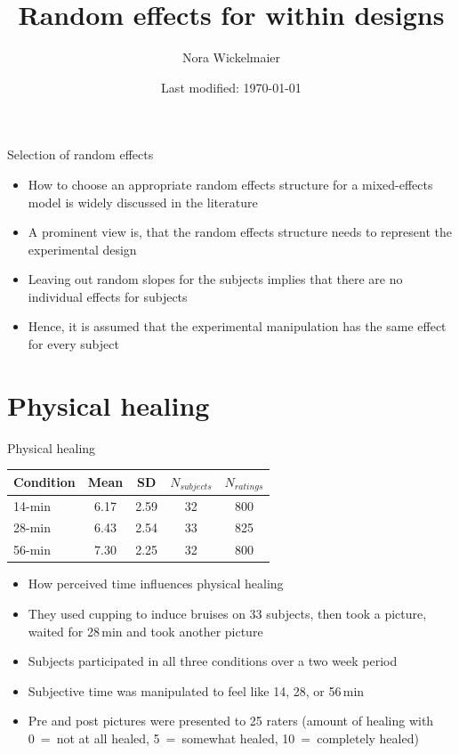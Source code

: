 \documentclass[aspectratio=169]{beamer}
\title{Random effects for within designs}
\author{Nora Wickelmaier}
\date{Last modified: \today}
\begin{document}
\begin{frame}{}
\thispagestyle{empty}
\titlepage
\end{frame}


\begin{frame}[<+->]{Selection of random effects}
  \begin{itemize}
    \item How to choose an appropriate random effects structure for a
      mixed-effects model is widely discussed in the literature
      \citep[e.\,g.,][]{Barr2013, Gelman2024, Bates2018}
    \item A prominent view is, that the random effects structure needs to
      represent the experimental design
    \item Leaving out random slopes for the subjects implies that there are no
      individual effects for subjects
    \item Hence, it is assumed that the experimental manipulation has the same
      effect for every subject
  \end{itemize}
\end{frame}

\section{Physical healing}

\begin{frame}[<+->]{Physical healing}{\citep{Aungle2023}}
  \begin{center}
  \begin{tabular}{l|cccc}
    \hline
    Condition & Mean  & SD    & $N_{subjects}$ & $N_{ratings}$ \\
    \hline
    14-min    & 6.17  & 2.59  & 32             &  800 \\
    28-min    & 6.43  & 2.54  & 33             &  825 \\
    56-min    & 7.30  & 2.25  & 32             &  800 \\
    \hline
  \end{tabular}
  \end{center}
  \begin{itemize}
    \item How perceived time influences physical healing
    \item They used cupping to induce bruises on 33 subjects, then took a
      picture, waited for 28\,min and took another picture
    \item Subjects participated in all three conditions over a two week period
    \item Subjective time was manipulated to feel like 14, 28, or 56\,min
    \item Pre and post pictures were presented to 25 raters (amount of healing
      with 0~=~not at all healed, 5~=~somewhat healed, 10~=~completely healed)
  \end{itemize}
\end{frame}
\end{document}
